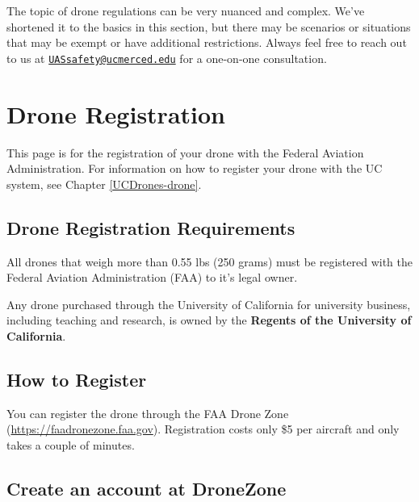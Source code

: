 \documentclass[
  12pt,
]{book}
\newenvironment{notebox}{
  \definecolor{shadecolor}{gray}{.8}  %
  \color{black}
  \begin{shaded}}
 {\end{shaded}}
\begin{document}
\begin{notebox}
The topic of drone regulations can be very nuanced and complex. We've shortened it to the basics in this section, but there may be scenarios or situations that may be exempt or have additional restrictions. Always feel free to reach out to us at \href{mailto:UASsafety@ucmerced.edu}{\nolinkurl{UASsafety@ucmerced.edu}} for a one-on-one consultation.

\end{notebox}

\section{Drone Registration}\label{registration}

\begin{notebox}
This page is for the registration of your drone with the Federal Aviation Administration. For information on how to register your drone with the UC system, see Chapter \ref{UCDrones-drone}.

\end{notebox}

\subsection{Drone Registration Requirements}\label{drone-registration-requirements}

All drones that weigh more than 0.55 lbs (250 grams) must be registered with the Federal Aviation Administration (FAA) to it's legal owner.

Any drone purchased through the University of California for university business, including teaching and research, is owned by the \textbf{Regents of the University of California}.

\subsection{How to Register}\label{how-to-register}

You can register the drone through the FAA Drone Zone (\url{https://faadronezone.faa.gov}). Registration costs only \$5 per aircraft and only takes a couple of minutes.

\subsection{Create an account at DroneZone}\label{create-an-account-at-dronezone}
\end{document}
